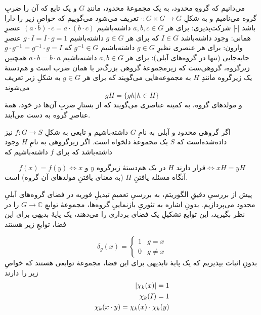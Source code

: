 \documentclass[a4paper,12pt]{article}
\begin{document}
می‌دانیم که گروهِ محدود، به یک مجموعهٔ محدود، مانندِ \(G\) و یک تابع که آن را ضربِ گروه می‌نامیم و به شکلِ 
\(\cdot: G \times G \to G\)
تعریف می‌شود می‌گوییم که خواصِ زیر را دارا باشد
[-]
 شرکت‌پذیری: برای هر \(a, b, c \in G\) داشته‌باشیم 
\((a \cdot b) \cdot c = a \cdot (b \cdot c)\)
 عنصرِ همانی: وجود داشته‌باشد \(I \in G\) که برای هر \(g \in G\) داشته‌باشیم
\(g \cdot I = I \cdot g = 1\)
 عنصرِ وارون: برای هر عنصری نظیرِ \(g \in G\) داشته‌باشیم 
\(g^{-1} \in G\)
که  
\(g \cdot g^{-1} = g^{-1} \cdot g = I\)
 جابه‌جایی (تنها در گروه‌های آبلی): برای هر \(a, b \in G\) داشته‌باشیم
\(a \cdot b = b \cdot a\) 
همچنین زیرگروه، گروهی‌ست که زیرمجموعهٔ گروهی بزرگ‌تر با همان ضرب است و هم‌دستهٔ
یک زیرگروه مانندِ \(H\) به مجموعه‌هایی می‌گویند که برای هر \(g \in G\) به شکلِ زیر تعریف می‌شوند
\begin{equation}
    gH = \{gh | h \in H\}
\end{equation}
و مولد‌های گروه، به کمینه عناصری می‌گویند که از بستارِ ضربِ آن‌ها در خود، همهٔ عناصرِ گروه به دست می‌آیند.

اگر گروهی محدود و آبلی به نامِ \(G\) داشته‌باشیم و تابعی به شکلِ
\(f : G \to S\)
نیز داده‌شده‌است که \(S\) یک مجموعهٔ دلخواه است.
اگر زیرگروهی به نامِ \(H\) وجود داشته‌باشد که برای \(f\) داشته‌باشیم که

\begin{equation}
    f(x) = f(y) \Leftrightarrow \text{\(x\) و \(y\) در یک هم‌دستهٔ زیرگروه \(H\) قرار دارند} \Leftrightarrow xH = yH
\end{equation}
آنگاه مسئله یافتنِ \(H\) (به معنای یافتنِ مولدهای آن گروه) است.

پیش از بررسیِ دقیقِ الگوریتم، به بررسیِ تعمیمِ تبدیلِ فوریه در فضای گروه‌های آبلیِ محدود می‌پردازیم. بدونِ اشاره به تئوریِ بازنماییِ گروه‌ها، مجموعهٔ توابعِ 
\(G \to \mathbb{C}\)
را در نظر بگیرید، این توابع تشکیلِ یک فضای برداری را می‌دهند، یک پایهٔ بدیهی برای این فضا، توابعِ زیر هستند

\begin{equation}
    \delta_g(x) = \begin{cases}
    1 & g=x \\
    0 & g \ne x
    \end{cases}
\end{equation}
بدونِ اثبات بپذیریم که یک پایهٔ نابدیهی برای این فضا، مجموعهٔ توابعی هستند که خواصِ زیر را دارند 
\begin{eqnarray}
    \abs{\chi_k(x)} = 1 \\
    \chi_k(I) = 1 \\
    \chi_k(x \cdot y) = \chi_k(x) \cdot \chi_k(y) 
\end{eqnarray}
\end{document}
